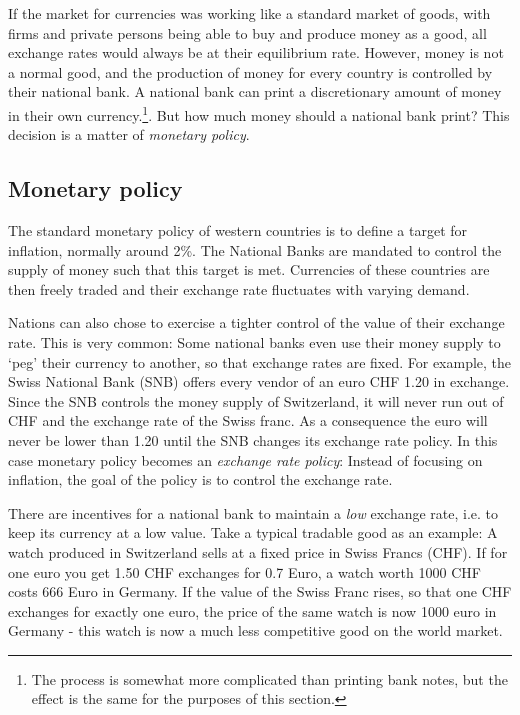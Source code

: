 If the market for currencies was working like a standard market of goods, with firms and private persons being able to buy and produce money as a good, 
all exchange rates would always be at their equilibrium rate. However, money is not a normal good, and 
the production of money for every country is controlled by their 
national bank. A national bank can print a 
discretionary amount of money in their own currency.\footnote{The 
process is somewhat more complicated than printing bank notes, but the 
effect is the same for the purposes of this section.}. But how much money should a national bank print? This decision is a matter of \emph{monetary policy}. 

\subsection{Monetary policy}

The standard monetary policy of western countries is to define a target 
for inflation, normally around 2\%. The National Banks are mandated to 
control the supply of money such that this target is met. Currencies of 
these countries are then freely traded and their exchange rate 
fluctuates with varying demand. 

Nations can also chose to exercise a tighter control of the value of 
their exchange rate.  This is very common: Some national banks even use 
their money supply to `peg' their currency to another, so that exchange 
rates are fixed.  For example, the Swiss National Bank (SNB) offers 
every vendor of an euro CHF 1.20 in exchange.  Since the SNB controls 
the money supply of Switzerland, it will never run out of CHF and the 
exchange rate of the Swiss franc. As a consequence the euro will never 
be lower than 1.20 until the SNB changes its exchange rate policy. In 
this case monetary policy becomes an \emph{exchange rate policy}: Instead of 
focusing on inflation, the goal of the policy is to control the exchange 
rate.

There are incentives for a national bank to maintain a \emph{low} exchange rate, i.e. to keep its currency at a low value. Take a typical tradable good as an example: A watch produced in Switzerland sells at a fixed price in Swiss Francs (CHF). If for one euro you get 1.50 CHF exchanges for 0.7 Euro, a watch worth 1000 CHF costs 666 Euro in Germany. If the value of the Swiss Franc rises, so that one CHF exchanges for exactly one euro, the price of the same watch is now 1000 euro in Germany - this watch is now a much less competitive good on the world market.

